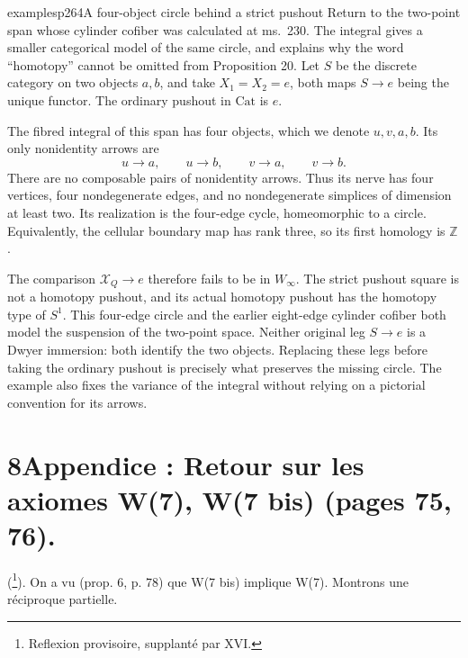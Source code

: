 
\begin{dcomment}{examples}{p264}{A four-object circle behind a strict pushout}
Return to the two-point span whose cylinder cofiber was calculated at ms.~230. The integral gives a smaller categorical model of the same circle, and explains why the word ``homotopy'' cannot be omitted from Proposition 20. Let $S$ be the discrete category on two objects $a,b$, and take $X_1=X_2=e$, both maps $S\to e$ being the unique functor. The ordinary pushout in $\mathrm{Cat}$ is $e$.

The fibred integral of this span has four objects, which we denote $u,v,a,b$. Its only nonidentity arrows are
\[
 u\longrightarrow a,\qquad u\longrightarrow b,
 \qquad v\longrightarrow a,\qquad v\longrightarrow b.
\]
There are no composable pairs of nonidentity arrows. Thus its nerve has four vertices, four nondegenerate edges, and no nondegenerate simplices of dimension at least two. Its realization is the four-edge cycle, homeomorphic to a circle. Equivalently, the cellular boundary map has rank three, so its first homology is $\mathbb Z$.

The comparison $\mathcal X_Q\to e$ therefore fails to be in $W_\infty$. The strict pushout square is not a homotopy pushout, and its actual homotopy pushout has the homotopy type of $S^1$. This four-edge circle and the earlier eight-edge cylinder cofiber both model the suspension of the two-point space. Neither original leg $S\to e$ is a Dwyer immersion: both identify the two objects. Replacing these legs before taking the ordinary pushout is precisely what preserves the missing circle. The example also fixes the variance of the integral without relying on a pictorial convention for its arrows.
\end{dcomment}


\section*{8\quad Appendice : Retour sur les axiomes W(7), W(7 bis) (pages 75, 76).}

(\footnote[135]{Reflexion provisoire, supplanté par XVI.}). On a vu (prop. 6, p. 78) que W(7 bis) implique W(7). Montrons une réciproque partielle. %

